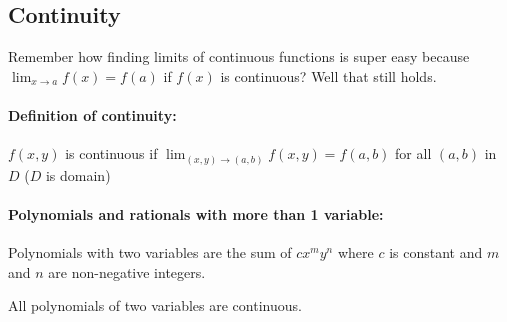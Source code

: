 \documentclass[a4paper,12pt]{report}
\begin{document}
\subsection{Continuity}
Remember how finding limits of continuous functions is super easy because $\lim_{x\to a} f(x) = f(a)$ if $f(x)$ is continuous? Well that still holds.

\paragraph{Definition of continuity: }

$f(x, y)$ is continuous if $\lim_{(x, y) \to (a, b)} f(x, y) = f(a, b)$ for all $(a, b)$ in $D$ ($D$ is domain)

\paragraph{Polynomials and rationals with more than 1 variable: }

Polynomials with two variables are the sum of $cx^my^n$ where $c$ is constant and $m$ and $n$ are non-negative integers.

All polynomials of two variables are continuous. 
\end{document}
